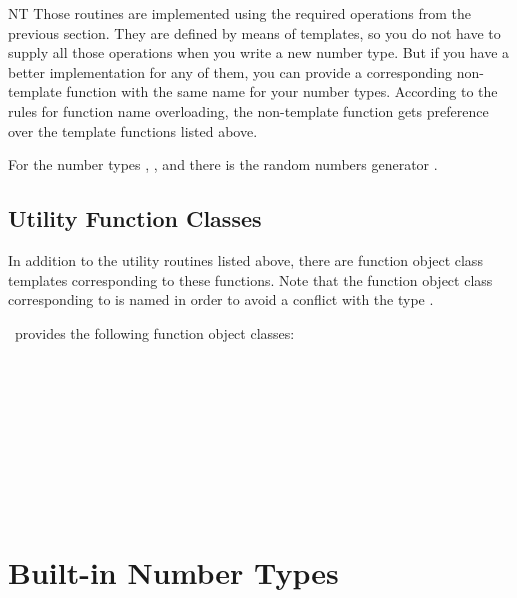 \begin{ccClass} {NT}
Those routines are implemented using the required operations from the
previous section. They are defined by means of templates, so you do not
have to supply all those operations when you write  a new number type.
But if you have a better implementation for any of them, you can provide a 
corresponding non-template function with the same name for your number types. 
According to the rules for function name overloading, the non-template function
gets preference over the template functions listed above. 

For the number types , , and  there is
the random numbers generator .




\end{ccClass} 

\subsection{Utility Function Classes}
In addition to the utility routines listed above, 
there are function object class templates corresponding to these functions.
Note that the function object class corresponding to  is
named  in order to avoid a conflict with the type 
.

\cgal\ provides the following function object classes:


\\
\\
\\
\\
\\
\\
\\
\\

\section{Built-in Number Types}


